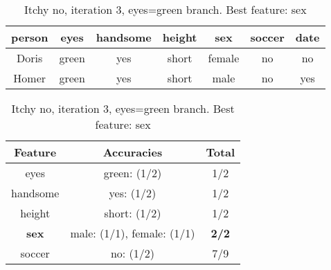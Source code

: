 \begin{table}[h!]
  \centering
  \begin{tabular}{cccccc|c}
    \toprule
    person      & eyes  & handsome & height & sex    & soccer & date\\
    \midrule
    Doris       & green & yes      & short  & female & no     & no  \\
    Homer       & green & yes      & short  & male   & no     & yes \\
    \bottomrule
  \end{tabular}

  \vspace{.5cm}

  \begin{tabular}{ccc}
    \toprule
    Feature      & Accuracies                              & Total\\
    \midrule
    eyes         & green: (1/2)                            & 1/2\\
    handsome     & yes: (1/2)                              & 1/2\\
    height       & short: (1/2)                            & 1/2\\
    \textbf{sex} & male: (1/1), female: (1/1)              & \textbf{2/2}\\
    soccer       & no: (1/2)                               & 7/9\\
    \bottomrule
  \end{tabular}
  \caption*{Itchy no, iteration 3, eyes=green branch. Best feature: sex}
\end{table}
